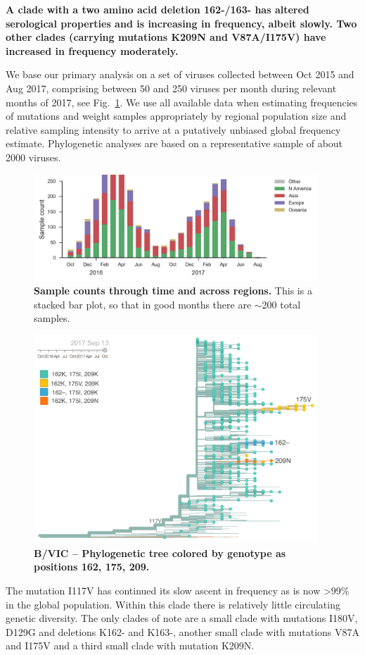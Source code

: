 \documentclass[11pt,oneside,letterpaper]{article}
\newcommand{\FIG}[1]{Fig.~\ref{#1}}
\begin{document}
\textbf{A clade with a two amino acid deletion 162-/163- has altered
serological properties and is increasing in frequency, albeit slowly.
Two other clades (carrying mutations K209N and V87A/I175V) have
increased in frequency moderately.}

We base our primary analysis on a set of viruses collected between Oct
2015 and Aug 2017, comprising between 50 and 250 viruses per month
during relevant months of 2017, see \FIG{Vic_counts}. We use all available data when
estimating frequencies of mutations and weight samples appropriately by
regional population size and relative sampling intensity to arrive at a
putatively unbiased global frequency estimate. Phylogenetic analyses are
based on a representative sample of about 2000 viruses.

\begin{figure}[H]
  \centering
  \includegraphics[width=0.95\textwidth]{../figures/sep-2017/vic_counts.png}
  \caption{\textbf{Sample counts through time and across regions.}
  This is a stacked bar plot, so that in good months there are $\sim$200 total samples.
  }
  \label{Vic_counts}
\end{figure}
\clearpage
\begin{figure}[H]
  \centering
  \includegraphics[width=0.95\textwidth]{../figures/sep-2017/vic_tree.png}
  \caption{\textbf{B/VIC -- Phylogenetic tree colored by genotype as positions 162, 175, 209.}
  }
  \label{Vic_tree}
\end{figure}
The mutation I117V has continued its slow ascent in frequency as is now
\textgreater{}99\% in the global population. Within this clade there is
relatively little circulating genetic diversity. The only clades of note
are a small clade with mutations I180V, D129G and deletions K162- and
K163-, another small clade with mutations V87A and I175V and a third
small clade with mutation K209N.
\end{document}

